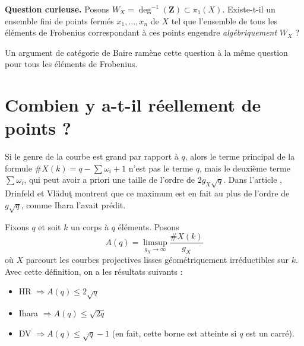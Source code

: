 \noindent
{\bf Question curieuse.}
Posons $W_X = \deg^{-1}(\mathbf{Z})\subset \pi_1(X)$.
Existe-t-il un ensemble fini de points fermés $x_1, \ldots, x_n$ de $X$ tel que
l'ensemble de tous les éléments de Frobenius correspondant à ces points
engendre {\it algébriquement} $W_X$ ?

\medskip\noindent
Un argument de catégorie de Baire ramène cette question à la même question
pour tous les éléments de Frobenius.





\section{Combien y a-t-il réellement de points ?}
\label{section-really}

\noindent
Si le genre de la courbe est grand par rapport à $q$, alors le terme
principal de la formule $\# X(k) = q - \sum \omega_i + 1$ n'est pas le terme $q$,
mais le deuxième terme $\sum \omega_i$, qui peut avoir a priori une
taille de l'ordre de $2g_X\sqrt{q}$. Dans l'article \cite{Drinfeld-number},
Drinfeld et Vlăduţ montrent que ce maximum est en fait au plus de l'ordre de
$g\sqrt{q}$, comme Ihara l'avait prédit.

\medskip\noindent
Fixons $q$ et soit $k$ un corps à $q$ éléments. Posons
$$
A(q) = \limsup_{g_X \to \infty} \frac{\# X(k)}{g_X}
$$
où $X$ parcourt les courbes projectives lisses géométriquement irréductibles
sur $k$. Avec cette définition, on a les résultats suivants :
\begin{itemize}
\item HR $\Rightarrow A(q)\leq 2\sqrt{q}$
\item Ihara $\Rightarrow A(q)\leq \sqrt{2q}$
\item DV $\Rightarrow A(q)\leq \sqrt{q}-1$ (en fait, cette borne est atteinte si $q$
est un carré).
\end{itemize}

